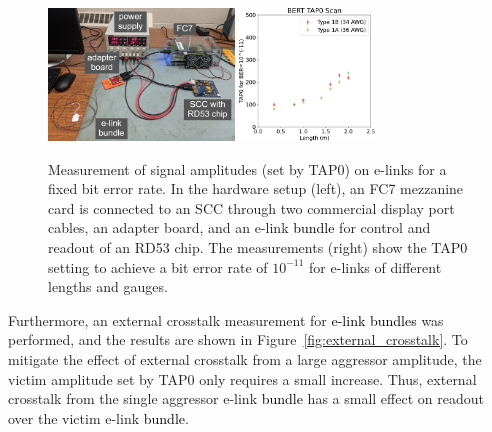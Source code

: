 \documentclass[a4paper,11pt]{article}
\newcommand{\fig}{Figure}
\newcommand{\black}{\textcolor{black}}
\begin{document}
\begin{figure}[htbp]
\centering
\includegraphics[width=0.44\textwidth,origin=c]{../figures/fc7_elink_scc_setup_labeled.jpeg}
\qquad
\includegraphics[width=0.32\textwidth,origin=c]{../figures/BERT_TAP0_vs_Length-crop.pdf}
\caption{
\label{fig:tap0_vs_length}
Measurement of signal amplitudes (set by TAP0) on e-links for a fixed bit error rate.
In the hardware setup (left), an FC7 mezzanine card is connected to an SCC through two commercial display port cables, an adapter board, and an e-link \black{bundle} for control and readout of an RD53 chip.
The measurements (right) show the TAP0 setting to achieve a bit error rate of $10^{-11}$ for e-links of different lengths and gauges.
}
\end{figure}


Furthermore, an external crosstalk measurement for \black{e-link bundles} was performed, and the results are shown in \fig~\ref{fig:external_crosstalk}.
To mitigate the effect of external crosstalk from a large aggressor amplitude, the victim amplitude set by TAP0 only requires a small increase.
Thus, external crosstalk from the single aggressor e-link \black{bundle} has a small effect on readout over the victim e-link \black{bundle}.
\end{document}
